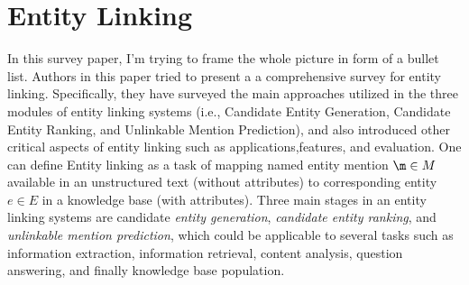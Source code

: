 \documentclass[letterpaper,12pt]{article}
\begin{document}
\section{Entity Linking}
In this survey paper, I'm trying to frame the whole picture in form of a bullet list. Authors in this paper tried to present a a comprehensive survey for entity linking. Specifically, they have surveyed the main approaches utilized in the three modules of entity linking systems (i.e., Candidate Entity Generation, Candidate Entity Ranking, and Unlinkable Mention Prediction), and also introduced other critical aspects of entity linking such as applications,features, and evaluation. One can define Entity linking as a task of mapping named entity mention $\m \in M$ available in an unstructured text (without attributes) to corresponding entity $e \in E$ in a knowledge base (with attributes). Three main stages in an entity linking systems are candidate \textit{entity generation}, \textit{candidate entity ranking}, and \textit{unlinkable mention prediction}, which could be applicable to several tasks such as information extraction, information retrieval, content analysis, question answering, and finally knowledge base population.
\end{document}
